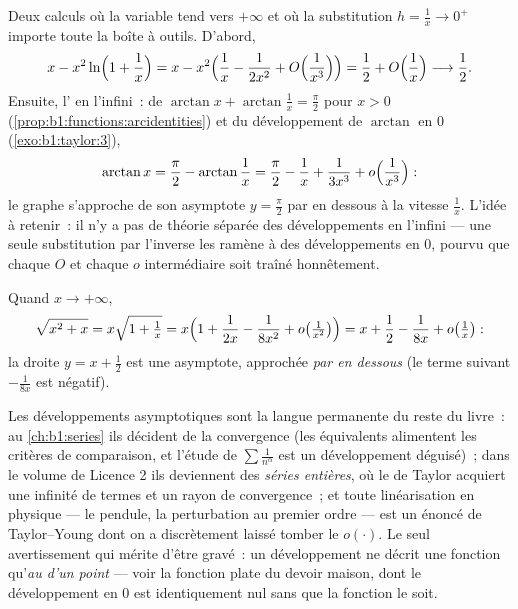 \begin{example}\label{ex:b1:taylor:atinfinity}
Deux calculs où la variable tend vers $+\infty$ et où la
substitution $h = \frac1x \to 0^+$ importe toute la boîte à outils.
D'abord,
\[
x - x^2\ln\Bigl(1 + \frac1x\Bigr)
= x - x^2\Bigl(\frac1x - \frac{1}{2x^2} +
O\Bigl(\frac{1}{x^3}\Bigr)\Bigr)
= \frac12 + O\Bigl(\frac1x\Bigr) \longrightarrow \frac12 .
\]
Ensuite, l' en l'infini~: de $\arctan x +
\arctan\frac1x = \frac\pi2$ pour $x > 0$
(\cref{prop:b1:functions:arcidentities}) et du développement de
$\arctan$ en $0$ (\cref{exo:b1:taylor:3}),
\[
\arctan x = \frac\pi2 - \arctan\frac1x
= \frac\pi2 - \frac1x + \frac{1}{3x^3} +
o\Bigl(\frac{1}{x^3}\Bigr) :
\]
le graphe s'approche de son asymptote $y = \frac\pi2$ par en dessous
à la vitesse $\frac1x$. L'idée à retenir~: il n'y a pas de théorie
séparée des développements en l'infini --- une seule substitution par
l'inverse les ramène à des développements en $0$, pourvu que chaque
$O$ et chaque $o$ intermédiaire soit traîné honnêtement.
\end{example}

\begin{example}\label{ex:b1:taylor:asymptote}
Quand $x \to +\infty$,
\[
\sqrt{x^2 + x} = x\sqrt{1 + \tfrac1x}
= x\Bigl(1 + \frac{1}{2x} - \frac{1}{8x^2} + o\bigl(\tfrac{1}{x^2}\bigr)\Bigr)
= x + \frac12 - \frac{1}{8x} + o\bigl(\tfrac 1x\bigr):
\]
la droite $y = x + \frac12$ est une asymptote, approchée \emph{par en
dessous} (le terme suivant $-\frac{1}{8x}$ est négatif).
\end{example}

\begin{remark}
Les développements asymptotiques sont la langue permanente du reste
du livre~: au \cref{ch:b1:series} ils décident de la convergence
(les équivalents alimentent les critères de comparaison, et l'étude
de $\sum \frac{1}{n^\alpha}$ est un développement déguisé)~; dans le
volume de Licence 2 ils deviennent des \emph{séries entières}, où le
 de Taylor acquiert une infinité de termes et un rayon de
convergence~; et toute linéarisation en physique --- le pendule, la
perturbation au premier ordre --- est un énoncé de Taylor--Young dont
on a discrètement laissé tomber le $o(\cdot)$. Le seul avertissement
qui mérite d'être gravé~: un développement ne décrit une fonction
qu'\emph{au  d'un point} --- voir la fonction plate du devoir
maison, dont le développement en $0$ est identiquement nul sans que la
fonction le soit.
\end{remark}

